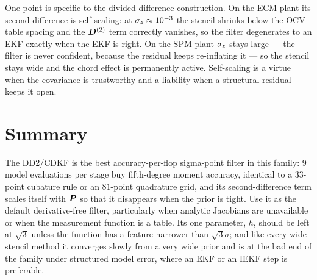 One point is specific to the divided-difference construction. On the ECM plant its second
difference is self-scaling: at $\sigma_z\approx10^{-3}$ the stencil shrinks below the OCV
table spacing and the $\bm{D}^{(2)}$ term correctly vanishes, so the filter degenerates to an EKF
exactly when the EKF is right. On the SPM plant $\sigma_z$ stays large --- the filter is
never confident, because the residual keeps re-inflating it --- so the stencil stays wide and
the chord effect is permanently active. Self-scaling is a virtue when the covariance is
trustworthy and a liability when a structural residual keeps it open.

\section{Summary}
The DD2/CDKF is the best accuracy-per-flop sigma-point filter in this family: $9$ model
evaluations per stage buy fifth-degree moment accuracy, identical to a $33$-point cubature rule
or an $81$-point quadrature grid, and its second-difference term scales itself with $\bm{P}$ so
that it disappears when the prior is tight. Use it as the default derivative-free filter,
particularly when analytic Jacobians are unavailable or when the measurement function is a
table. Its one parameter, $h$, should be left at $\sqrt3$ unless the function has a feature
narrower than $\sqrt3\sigma$; and like every wide-stencil method it converges slowly from a very
wide prior and is at the bad end of the family under structured model error, where an EKF or an
IEKF step is preferable.
